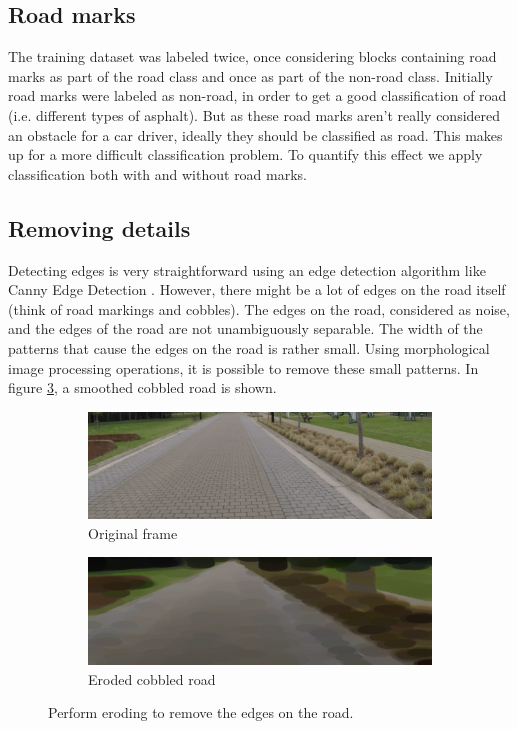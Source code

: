 \documentclass[runningheads,a4paper]{llncs}
\begin{document}
\subsection{Road marks}
The training dataset was labeled twice, once considering blocks containing road marks as part of the road class and once as part of the non-road class. Initially road marks were labeled as non-road, in order to get a good classification of road (i.e. different types of asphalt). But as these road marks aren't really considered an obstacle for a car driver, ideally they should be classified as road. This makes up for a more difficult classification problem. To quantify this effect we apply classification both with and without road marks. 

\subsection{Removing details}

Detecting edges is very straightforward using an edge detection algorithm like Canny Edge Detection \cite{canny}. However, there might be a lot of edges on the road itself (think of road markings and cobbles). The edges on the road, considered as noise, and the edges of the road are not unambiguously separable. The width of the patterns that cause the edges on the road is rather small. Using morphological image processing operations, it is possible to remove these small patterns.  In figure \ref{cobbles_erode_out}, a smoothed cobbled road is shown.
\begin{figure}[ht]
\centering
\begin{subfigure}{.5\textwidth}
  \centering
  \includegraphics[width=.9\textwidth]{fig/cobbles_in.png}
  \caption{Original frame\label{cobbles_in}}
\end{subfigure}%
\begin{subfigure}{.5\textwidth}
  \centering
  \includegraphics[width=.9\textwidth]{fig/cobbles_erode_out.png}
  \caption{Eroded cobbled road\label{cobbles_erode_out}}
\end{subfigure}
\caption{Perform eroding to remove the edges on the road.}
\end{figure}
\end{document}
